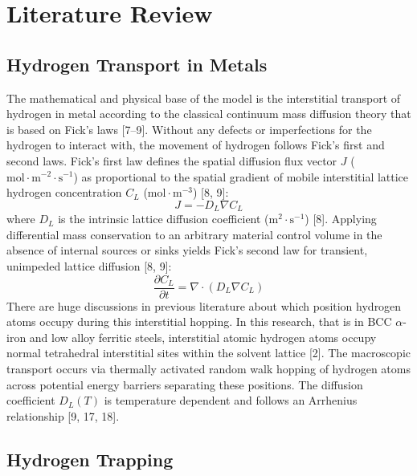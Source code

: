 \documentclass[a4paper,12pt,oneside]{report}
\begin{document}
\chapter{Literature Review}
\label{chap:literature_review}

\section{Hydrogen Transport in Metals}
\label{sec:hydrogen_transport}

The mathematical and physical base of the model is the interstitial transport of hydrogen in metal according to the classical continuum mass diffusion theory that is based on Fick's laws [7--9]. Without any defects or imperfections for the hydrogen to interact with, the movement of hydrogen follows Fick's first and second laws. Fick's first law defines the spatial diffusion flux vector $J$ ($\text{mol} \cdot \text{m}^{-2} \cdot \text{s}^{-1}$) as proportional to the spatial gradient of mobile interstitial lattice hydrogen concentration $C_L$ ($\text{mol} \cdot \text{m}^{-3}$) [8, 9]:
\begin{equation}
    J = -D_L \nabla C_L
\end{equation}
where $D_L$ is the intrinsic lattice diffusion coefficient ($\text{m}^2 \cdot \text{s}^{-1}$) [8]. Applying differential mass conservation to an arbitrary material control volume in the absence of internal sources or sinks yields Fick's second law for transient, unimpeded lattice diffusion [8, 9]:
\begin{equation}
    \frac{\partial C_L}{\partial t} = \nabla \cdot (D_L \nabla C_L)
\end{equation}
There are huge discussions in previous literature about which position hydrogen atoms occupy during this interstitial hopping. In this research, that is in BCC $\alpha$-iron and low alloy ferritic steels, interstitial atomic hydrogen atoms occupy normal tetrahedral interstitial sites within the solvent lattice [2]. The macroscopic transport occurs via thermally activated random walk hopping of hydrogen atoms across potential energy barriers separating these positions. The diffusion coefficient $D_L(T)$ is temperature dependent and follows an Arrhenius relationship [9, 17, 18].

\section{Hydrogen Trapping}
\label{sec:hydrogen_trapping}
\end{document}
